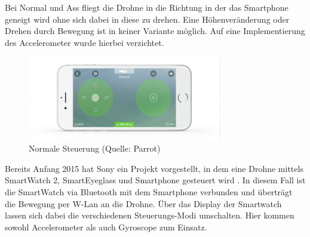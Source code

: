 \documentclass{article}
\begin{document}
Bei Normal und Ass fliegt die Drohne in die Richtung in der das Smartphone geneigt wird ohne sich dabei in diese zu drehen. Eine Höhenveränderung oder Drehen durch Bewegung ist in keiner Variante möglich. Auf eine Implementierung des Accelerometer wurde hierbei verzichtet.

\begin{figure}[htb]
\begin{minipage}[b]{1.0\linewidth}
  \centering
\centerline{\includegraphics[width= 85mm]{freeflight_mini.png}}
\end{minipage}
\caption{Normale Steuerung (Quelle: Parrot)}
\label{fig:freeflight}
\end{figure}

Bereits Anfang 2015 hat Sony ein Projekt vorgestellt, in dem eine Drohne mittels SmartWatch 2, SmartEyeglass und Smartphone gesteuert wird \cite{sonyflight}. In diesem Fall ist die SmartWatch via Bluetooth mit dem Smartphone verbunden und überträgt die Bewegung per W-Lan an die Drohne. Über das Display der Smartwatch lassen sich dabei die verschiedenen Steuerungs-Modi umschalten. Hier kommen sowohl Accelerometer als auch Gyroscope zum Einsatz.
\end{document}

